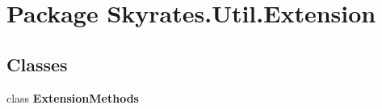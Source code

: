 \hypertarget{namespace_skyrates_1_1_util_1_1_extension}{\section{Package Skyrates.\-Util.\-Extension}
\label{namespace_skyrates_1_1_util_1_1_extension}
}
\subsection*{Classes}
\begin{DoxyCompactItemize}
\item 
class {\bfseries Extension\-Methods}
\end{DoxyCompactItemize}
